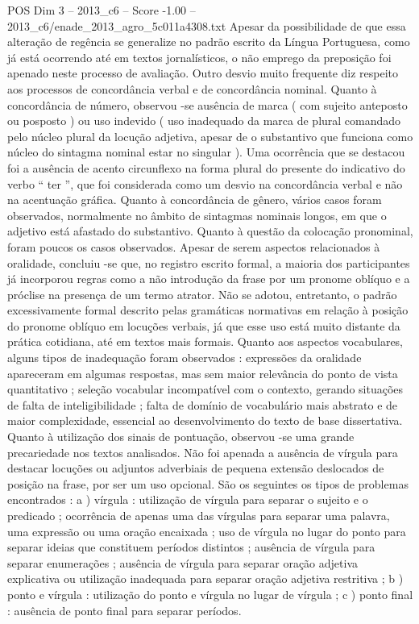 \begin{textsample}{POS Dim 3 – 2013\_c6 – Score -1.00 – 2013\_c6/enade\_2013\_agro\_5c011a4308.txt}
Apesar da possibilidade de que essa alteração de regência se generalize no padrão escrito da Língua Portuguesa, como já está ocorrendo até em textos jornalísticos, o não emprego da preposição foi apenado neste processo de avaliação.
Outro desvio muito frequente diz respeito aos processos de concordância verbal e de concordância nominal.
Quanto à concordância de número, observou -se ausência de marca ( com sujeito anteposto ou posposto ) ou uso indevido ( uso inadequado da marca de plural comandado pelo núcleo plural da locução adjetiva, apesar de o substantivo que funciona como núcleo do sintagma nominal estar no singular ).
Uma ocorrência que se destacou foi a ausência de acento circunflexo na forma plural do presente do indicativo do verbo “ ter ”, que foi considerada como um desvio na concordância verbal e não na acentuação gráfica.
Quanto à concordância de gênero, vários casos foram observados, normalmente no âmbito de sintagmas nominais longos, em que o adjetivo está afastado do substantivo.
Quanto à questão da colocação pronominal, foram poucos os casos observados.
Apesar de serem aspectos relacionados à oralidade, concluiu -se que, no registro escrito formal, a maioria dos participantes já incorporou regras como a não introdução da frase por um pronome oblíquo e a próclise na presença de um termo atrator.
Não se adotou, entretanto, o padrão excessivamente formal descrito pelas gramáticas normativas em relação à posição do pronome oblíquo em locuções verbais, já que esse uso está muito distante da prática cotidiana, até em textos mais formais.
Quanto aos aspectos vocabulares, alguns tipos de inadequação foram observados : expressões da oralidade apareceram em algumas respostas, mas sem maior relevância do ponto de vista quantitativo ; seleção vocabular incompatível com o contexto, gerando situações de falta de inteligibilidade ; falta de domínio de vocabulário mais abstrato e de maior complexidade, essencial ao desenvolvimento do texto de base dissertativa.
Quanto à utilização dos sinais de pontuação, observou -se uma grande precariedade nos textos analisados.
Não foi apenada a ausência de vírgula para destacar locuções ou adjuntos adverbiais de pequena extensão deslocados de posição na frase, por ser um uso opcional.
São os seguintes os tipos de problemas encontrados : a ) vírgula : utilização de vírgula para separar o sujeito e o predicado ; ocorrência de apenas uma das vírgulas para separar uma palavra, uma expressão ou uma oração encaixada ; uso de vírgula no lugar do ponto para separar ideias que constituem períodos distintos ; ausência de vírgula para separar enumerações ; ausência de vírgula para separar oração adjetiva explicativa ou utilização inadequada para separar oração adjetiva restritiva ; b ) ponto e vírgula : utilização do ponto e vírgula no lugar de vírgula ; c ) ponto final : ausência de ponto final para separar períodos.

\end{textsample}
